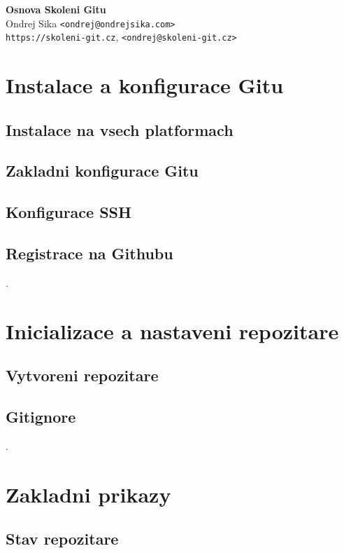 \documentclass[11pt]{article}
\begin{document}
\begin{center}
{\Huge \bf Osnova Skoleni Gitu}\\
\vspace*{0.3cm}
{\Large
    Ondrej Sika  \texttt{<ondrej@ondrejsika.com>}\\
    \texttt{https://skoleni-git.cz}, \texttt{<ondrej@skoleni-git.cz>}\\
}
\vspace*{0.6cm}
\end{center}

\section{Instalace a konfigurace Gitu}
\subsection{Instalace na vsech platformach}
\subsection{Zakladni konfigurace Gitu}
\subsection{Konfigurace SSH}
\subsection{Registrace na Githubu}

.

\section{Inicializace a nastaveni repozitare}
\subsection{Vytvoreni repozitare}
\subsection{Gitignore}

.

\section{Zakladni prikazy}
\subsection{Stav repozitare}
\end{document}
